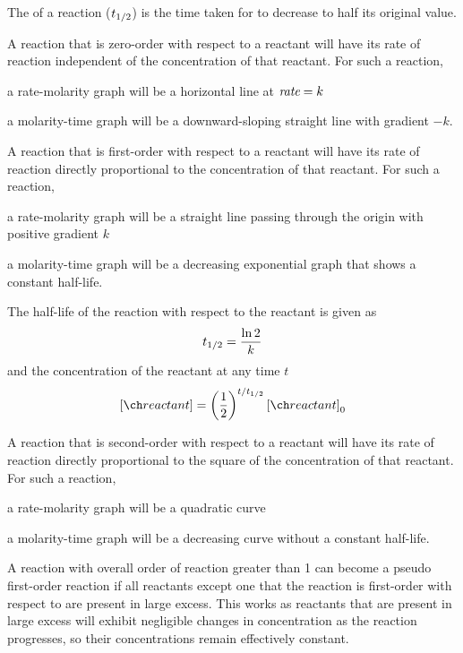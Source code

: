 \documentclass[Chemistry.tex]{subfiles}
\begin{document}
The  of a reaction (\(t_{1/2}\)) is the time taken for  to decrease to half its original value.

A reaction that is zero-order with respect to a reactant will have its rate of reaction independent of the concentration of that reactant. For such a reaction, \begin{slinenum}
\item a rate-molarity graph will be a horizontal line at \(\textit{rate} = k\)
\item a molarity-time graph will be a downward-sloping straight line with gradient \(-k\).\end{slinenum}

A reaction that is first-order with respect to a reactant will have its rate of reaction directly proportional to the concentration of that reactant. For such a reaction, \begin{slinenum}
\item a rate-molarity graph will be a straight line passing through the origin with positive gradient \(k\)
\item a molarity-time graph will be a decreasing exponential graph that shows a constant half-life.\end{slinenum} The half-life of the reaction with respect to the reactant is given as \begin{equation}t_{1/2} = \frac{\ln2}{k}\end{equation} and the concentration of the reactant at any time \(t\) \begin{equation}\conc{reactant} = \left(\frac{1}{2}\right)^{t/\slhl}\conc{reactant}_0\end{equation}

A reaction that is second-order with respect to a reactant will have its rate of reaction directly proportional to the square of the concentration of that reactant. For such a reaction, \begin{slinenum}
\item a rate-molarity graph will be a quadratic curve
\item a molarity-time graph will be a decreasing curve without a constant half-life.\end{slinenum}

A reaction with overall order of reaction greater than 1 can become a pseudo first-order reaction if all reactants except one that the reaction is first-order with respect to are present in large excess. This works as reactants that are present in large excess will exhibit negligible changes in concentration as the reaction progresses, so their concentrations remain effectively constant.
\end{document}
